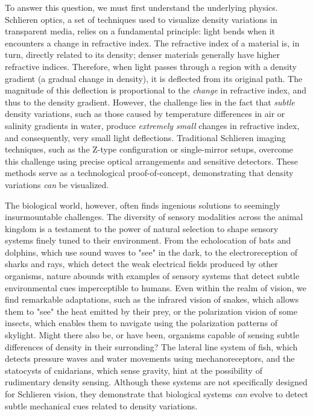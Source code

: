 \documentclass[11pt]{article}
\begin{document}
To answer this question, we must first understand the underlying physics. Schlieren optics, a set of techniques used to visualize density variations in transparent media, relies on a fundamental principle: light bends when it encounters a change in refractive index. The refractive index of a material is, in turn, directly related to its density; denser materials generally have higher refractive indices. Therefore, when light passes through a region with a density gradient (a gradual change in density), it is deflected from its original path. The magnitude of this deflection is proportional to the \textit{change} in refractive index, and thus to the density gradient. However, the challenge lies in the fact that \textit{subtle} density variations, such as those caused by temperature differences in air or salinity gradients in water, produce \textit{extremely small} changes in refractive index, and consequently, very small light deflections. Traditional Schlieren imaging techniques, such as the Z-type configuration or single-mirror setups, overcome this challenge using precise optical arrangements and sensitive detectors. These methods serve as a technological proof-of-concept, demonstrating that density variations \textit{can} be visualized.

The biological world, however, often finds ingenious solutions to seemingly insurmountable challenges. The diversity of sensory modalities across the animal kingdom is a testament to the power of natural selection to shape sensory systems finely tuned to their environment. From the echolocation of bats and dolphins, which use sound waves to "see" in the dark, to the electroreception of sharks and rays, which detect the weak electrical fields produced by other organisms, nature abounds with examples of sensory systems that detect subtle environmental cues imperceptible to humans. Even within the realm of vision, we find remarkable adaptations, such as the infrared vision of snakes, which allows them to "see" the heat emitted by their prey, or the polarization vision of some insects, which enables them to navigate using the polarization patterns of skylight. Might there also be, or have been, organisms capable of sensing subtle differences of density in their surronding? The lateral line system of fish, which detects pressure waves and water movements using mechanoreceptors, and the statocysts of cnidarians, which sense gravity, hint at the possibility of rudimentary density sensing. Although these systems are not specifically designed for Schlieren vision, they demonstrate that biological systems \textit{can} evolve to detect subtle mechanical cues related to density variations.
\end{document}

